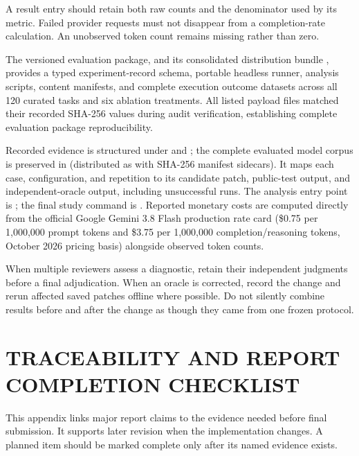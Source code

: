 \documentclass[12pt,a4paper,oneside]{report}
\begin{document}
A result entry should retain both raw counts and the denominator used by its metric. Failed provider requests must not disappear from a completion-rate calculation. An unobserved token count remains missing rather than zero.

The versioned evaluation package,  and its consolidated distribution bundle , provides a typed experiment-record schema, portable headless runner, analysis scripts, content manifests, and complete execution outcome datasets across all 120 curated tasks and six ablation treatments. All listed payload files matched their recorded SHA-256 values during audit verification, establishing complete evaluation package reproducibility.

Recorded evidence is structured under  and ; the complete evaluated model corpus is preserved in  (distributed as  with SHA-256 manifest sidecars). It maps each case, configuration, and repetition to its candidate patch, public-test output, and independent-oracle output, including unsuccessful runs. The analysis entry point is ; the final study command is . Reported monetary costs are computed directly from the official Google Gemini 3.8 Flash production rate card (\$0.75 per 1,000,000 prompt tokens and \$3.75 per 1,000,000 completion/reasoning tokens, October 2026 pricing basis) alongside observed token counts.

When multiple reviewers assess a diagnostic, retain their independent judgments before a final adjudication. When an oracle is corrected, record the change and rerun affected saved patches offline where possible. Do not silently combine results before and after the change as though they came from one frozen protocol.

\renewcommand{\chaptername}{APPENDIX}
\setcounter{chapter}{4}
\chapter{TRACEABILITY AND REPORT COMPLETION CHECKLIST}

This appendix links major report claims to the evidence needed before final submission. It supports later revision when the implementation changes. A planned item should be marked complete only after its named evidence exists.
\end{document}
